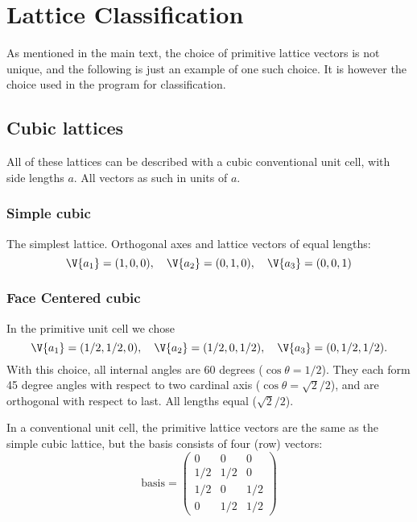 \documentclass[main.tex]{subfiles}
\begin{document}
	\section{Lattice Classification}
	As mentioned in the main text, the choice of primitive lattice vectors is not unique, and the following is just an example of one such choice. It is however the choice used in the program for classification.
	
	
	\subsection*{Cubic lattices}
	All of these lattices can be described with a cubic conventional unit cell, with side lengths $ a $. All vectors as such in units of $ a $.
	
	\subsubsection*{Simple cubic}
	The simplest lattice. Orthogonal axes and lattice vectors of equal lengths:
	\begin{equation*}
		\V{a_1} = (1,0,0), \quad \V{a_2} = (0,1,0), \quad \V{a_3} = (0,0,1)
	\end{equation*}
	
	\subsubsection*{Face Centered cubic}
	In the primitive unit cell we chose
	\begin{equation*}
		\V{a_1} = (1/2, 1/2, 0),\quad \V{a_2} = (1/2, 0, 1/2),\quad \V{a_3} = (0, 1/2, 1/2).
	\end{equation*}
	With this choice, all internal angles are 60 degrees ($\cos \theta = 1/2$). They each form 45 degree angles with respect to two cardinal axis ($\cos \theta = \sqrt{2}/2$), and are orthogonal with respect to last. All lengths equal ($\sqrt{2}/2$).
	
	In a conventional unit cell, the primitive lattice vectors are the same as the simple cubic lattice, but the basis consists of four (row) vectors:
	\begin{equation*}
		\text{basis} = \begin{pmatrix}
			0 & 0 & 0 \\
			1/2 & 1/2 & 0 \\
			1/2 & 0 & 1/2 \\
			0 & 1/2 & 1/2
		\end{pmatrix}
	\end{equation*}
	
\end{document}
